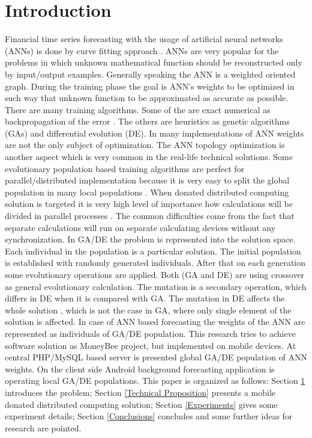 \documentclass{llncs}
\begin{document}

\section{Introduction} \label{Introduction}

Financial time series forecasting with the usage of artificial neural networks (ANNs) is done by curve fitting approach \cite{atanasova01}. ANNs are very popular for the problems in which unknown mathematical function should be reconstructed only by input/output examples. Generally speaking the ANN is a weighted oriented graph. During the training phase the goal is ANN's weights to be optimized in such way that unknown function to be approximated as accurate as possible. There are many training algorithms. Some of the are exact numerical as backpropagation of the error \cite{zankinski01}. The others are heuristics as genetic algorithms (GAs) and differential evolution (DE). In many implementations of ANN weights are not the only subject of optimization. The ANN topology optimization \cite{zankinski02} is another aspect which is very common in the real-life technical solutions. Some evolutionary population based training algorithms are perfect for parallel/distributed implementation because it is very easy to split the global population in many local populations \cite{balabanov03}. When donated distributed computing solution is targeted it is very high level of importance how calculations will be divided in parallel processes \cite{balabanov04}. The common difficulties come from the fact that separate calculations will run on separate calculating devices without any synchronization. In GA/DE the problem is represented into the solution space. Each individual in the population is a particular solution. The initial population is established with randomly generated individuals. After that on each generation some evolutionary operations are applied. Both (GA and DE) are using crossover as general evolutionary calculation. The mutation is a secondary operation, which differs in DE when it is compared with GA. The mutation in DE affects the whole solution \cite{tomov01}, which is not the case in GA, where only single element of the solution is affected. In case of ANN based forecasting the weights of the ANN are represented as individuals of GA/DE population. This research tries to achieve software solution as MoneyBee project, but implemented on mobile devices. At central PHP/MySQL based server is presented global GA/DE population of ANN weights. On the client side Android background forecasting application is operating local GA/DE populations. This paper is organized as follows: Section \ref{Introduction} introduces the problem; Section \ref{Technical Proposition} presents a mobile donated distributed computing solution; Section \ref{Experiments} gives some experiment details; Section \ref{Conclusions} concludes and some further ideas for research are pointed.
\end{document}
